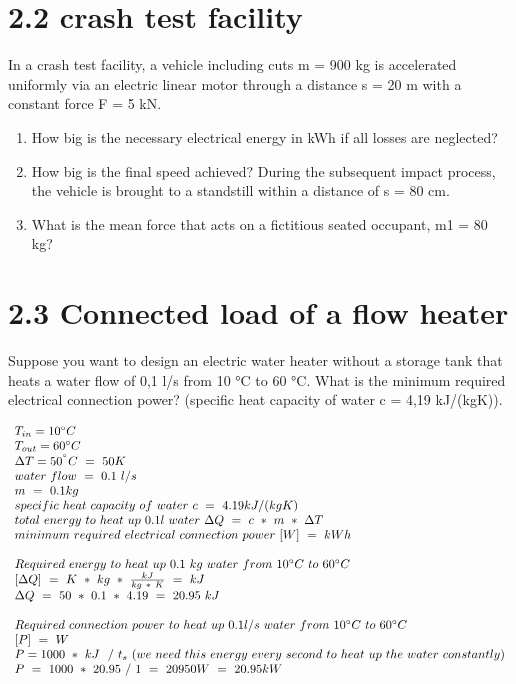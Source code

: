 \documentclass[10pt,ngerman]{scrartcl}
\begin{document}
\section{2.2 crash test facility}
In a crash test facility, a vehicle including cuts m = 900 kg is accelerated uniformly via an electric linear motor through a distance s = 20 m with a constant force F = 5 kN.
\begin{enumerate}
	\item How big is the necessary electrical energy in kWh if all losses are neglected?
	\item How big is the final speed achieved? During the subsequent impact process, the vehicle is brought to a standstill within a distance of s = 80 cm.
	\item What is the mean force that acts on a fictitious seated occupant, m1 = 80 kg?
\end{enumerate}

\section{2.3 Connected load of a flow heater}
Suppose you want to design an electric water heater without a storage tank that heats a water flow of 0,1 l/s from 10 °C to 60 °C. What is the minimum required electrical connection power? (specific heat capacity of water c = 4,19 kJ/(kgK)).

$
\begin{array}{l}
T_{in} = 10\degree C\\
T_{out} = 60\degree C\\
\Delta T=50^{\degree } C\ =\ 50K\\
water\ flow\ =\ 0.1\ l/s\\
m\ =\ 0.1 kg\\
specific\ heat\ capacity\ of\ water\ c\ =\ 4.19kJ/( kgK)\\
total\ energy\ to\ heat\ up\ 0.1 l\ water\ \Delta Q\ =\ c\ *\ m\ *\ \Delta T\\
minimum\ required\ electrical\ connection\ power\ [ W] \ =\ kWh\\
\\
Required\ energy\ to\ heat\ up\ 0.1\ kg\ water\ from\ 10\degree C\ to\ 60\degree C\\
\left[\Delta Q\right] \ =\ K\ *\ kg\ *\ \frac{kJ}{kg\ *\ K} \ =\ kJ\\
\Delta Q\ =\ 50\ *\ 0.1\ *\ 4.19\ =\ 20.95\ kJ\\
\\
Required\ connection\ power\ to\ heat\ up\ 0.1l/s\ water\ from\ 10\degree C\ to\ 60\degree C\\
\left[ P\right] \ =\ W\\
P = 1000\ *\ kJ\ \ /\ t_{s} \ ( we\ need\ this\ energy\ every\ second\ to\ heat\ up\ the\ water\ constantly)\\
P\ =\ 1000\ *\ 20.95\ /\ 1\ =\ 20950W\ =\ 20.95kW

\end{array}
$
\end{document}
